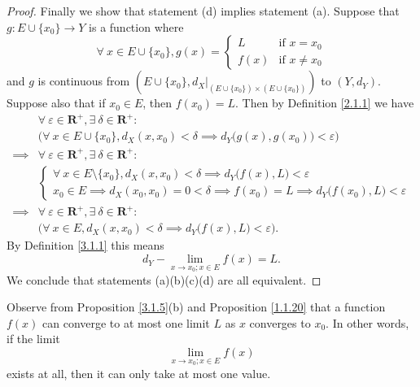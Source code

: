 \begin{proof}
    Finally we show that statement (d) implies statement (a).
    Suppose that \(g : E \cup \{x_0\} \to Y\) is a function where
    \[
        \forall\ x \in E \cup \{x_0\}, g(x) = \begin{cases}
            L    & \text{if } x = x_0    \\
            f(x) & \text{if } x \neq x_0
        \end{cases}
    \]
    and \(g\) is continuous from \((E \cup \{x_0\}, d_X|_{(E \cup \{x_0\}) \times (E \cup \{x_0\})})\) to \((Y, d_Y)\).
    Suppose also that if \(x_0 \in E\), then \(f(x_0) = L\).
    Then by Definition \ref{2.1.1} we have
    \begin{align*}
                 & \forall\ \varepsilon \in \mathbf{R}^+, \exists\ \delta \in \mathbf{R}^+ :                                      \\
                 & \Big(\forall\ x \in E \cup \{x_0\}, d_X(x, x_0) < \delta \implies d_Y\big(g(x), g(x_0)\big) < \varepsilon\Big) \\
        \implies & \forall\ \varepsilon \in \mathbf{R}^+, \exists\ \delta \in \mathbf{R}^+ :                                      \\
                 & \begin{cases}
            \forall\ x \in E \setminus \{x_0\}, d_X(x, x_0) < \delta \implies d_Y\big(f(x), L\big) < \varepsilon \\
            x_0 \in E \implies d_X(x_0, x_0) = 0 < \delta \implies f(x_0) = L \implies d_Y\big(f(x_0), L\big) < \varepsilon
        \end{cases}                                                                                     \\
        \implies & \forall\ \varepsilon \in \mathbf{R}^+, \exists\ \delta \in \mathbf{R}^+ :                                      \\
                 & \Big(\forall\ x \in E, d_X(x, x_0) < \delta \implies d_Y\big(f(x), L\big) < \varepsilon\Big).
    \end{align*}
    By Definition \ref{3.1.1} this means
    \[
        d_Y - \lim_{x \to x_0 ; x \in E} f(x) = L.
    \]
    We conclude that statements (a)(b)(c)(d) are all equivalent.
\end{proof}

\begin{remark}\label{3.1.6}
    Observe from Proposition \ref{3.1.5}(b) and Proposition \ref{1.1.20} that a function \(f(x)\) can converge to at most one limit \(L\) as \(x\) converges to \(x_0\).
    In other words, if the limit
    \[
        \lim_{x \to x_0 ; x \in E} f(x)
    \]
    exists at all, then it can only take at most one value.
\end{remark}


